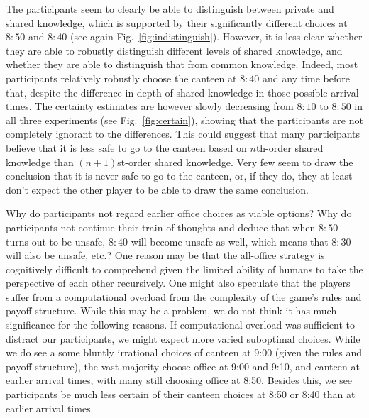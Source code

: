 The participants seem to clearly be able to distinguish between private and shared knowledge, which is supported by their significantly different choices at $8{:}50$ and $8{:}40$ (see again Fig.~\ref{fig:indistinguish}). However, it is less clear whether they are able to robustly distinguish different levels of shared knowledge, and whether they are able to distinguish that from common knowledge. Indeed, most participants relatively robustly choose the canteen at $8{:}40$ and any time before that, despite the difference in depth of shared knowledge in those possible arrival times. The certainty estimates are however slowly decreasing from $8{:}10$ to $8{:}50$ in all three experiments (see Fig.~\ref{fig:certain}), showing that the participants are not completely ignorant to the differences. This could suggest that many participants believe that it is less safe to go to the canteen based on $n$th-order shared knowledge than $(n+1)$st-order shared knowledge. Very few seem to draw the conclusion that it is never safe to go to the canteen, or, if they do, they at least don't expect the other player to be able to draw the same conclusion. 

Why do participants not regard earlier office choices as viable options? Why do participants not continue their train of thoughts and deduce that when $8{:}50$ turns out to be unsafe, $8{:}40$ will become unsafe as well, which means that $8{:}30$ will also be unsafe, etc.? One reason may be that the all-office strategy is cognitively difficult to comprehend given the  limited  ability of humans to take the perspective of each other recursively. 
One might also speculate that the players suffer from a 
computational overload from the complexity of the game's rules and payoff structure. While this may be a problem, we do not think it has much significance for the following reasons. If computational overload was sufficient to distract our participants, we might expect more varied suboptimal choices. While we do see a some bluntly irrational choices of canteen at 9:00 (given the rules and payoff structure), the vast majority choose office at 9:00 and 9:10, and canteen at earlier arrival times, with many still choosing office at 8:50. Besides this, we see participants be much less certain of their canteen choices at 8:50 or 8:40 than at earlier arrival times. 

